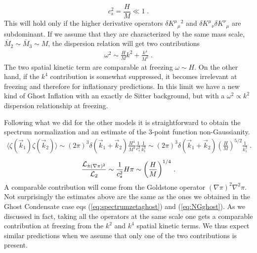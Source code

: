 \documentclass[12pt,letterpaper]{article}
\def\be{\begin{eqnarray}}
\def\ee{\end{eqnarray}}
\newcommand{\di}{\partial}
\begin{document}
{%
\begin{equation}
c^2_s=\frac{H}{M}\ll 1 \;.
\end{equation}
This will hold only if the higher derivative operators $\delta K^\mu {}_\mu {}^2$ and 
$\delta K^\mu {}_\nu \delta K^\nu {}_\mu$ are subdominant. If we assume
that they are characterized by the same mass scale, $\bar M_2 \sim \bar
M_3 \sim M$, the dispersion relation will get two contributions
\be
\omega^2 \sim \frac{H}{M} k^2 + \frac{k^4}{M^2} \;.
\ee
The two spatial kinetic term are comparable at freezing $\omega \sim
H$. On the other hand, if the $k^4$ contribution is somewhat
suppressed, it becomes irrelevant
 at freezing and therefore for inflationary predictions. In
this limit we have a new kind of Ghost Inflation with an exactly de
Sitter background, but with a $\omega^2 \propto k^2$ dispersion
relationship at freezing. 

Following what we did for the other models it is straightforward to
obtain the spectrum normalization and an estimate of the 3-point
function non-Gaussianity. 
\be
\label{eq:spectrumzetaleo}
\langle \zeta(\vec k_1) \zeta(\vec k_2)\rangle \sim (2 \pi)^3 \delta(\vec
k_1 + \vec k_2)  \frac{H^4}{M^4} \frac1{c_s^3} \frac{1}{k_1^3}  \sim (2 \pi)^3 \delta(\vec
k_1 + \vec k_2)  \left(\frac{H}{M}\right)^{5/2} \frac{1}{k_1^3} \;.
\ee
\be
\frac{{\cal L}_{\dot\pi(\nabla \pi)^2}}{{\cal L}_{2}}\sim
\frac1{c_s^2} H \pi \sim\left(\frac{H}{M}\right)^{1/4} \, .
\ee
A comparable contribution will come from the Goldstone operator
$(\nabla\pi)^2\nabla^2\pi$. Not surprisingly the estimates above are
the same as the ones we obtained in the Ghost Condensate case eqs
(\ref{eq:spectrumzetaghost}) and (\ref{eq:NGghost}). As we discussed
in fact, taking all the operators at the same scale one gets
a comparable contribution at freezing from the $k^2$ and $k^4$ spatial
kinetic terms. We thus expect similar predictions when we assume that
only one of the two contributions is present. 

}
\end{document}
